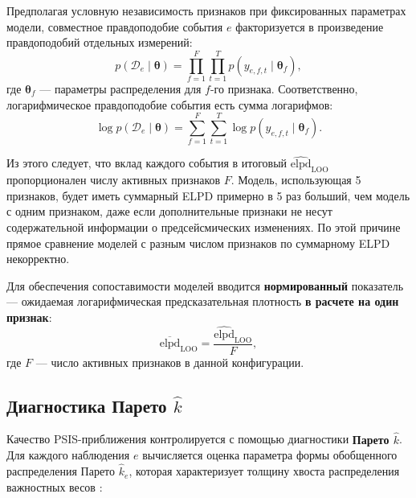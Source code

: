 \documentclass[14pt]{mmcs_article}
\begin{document}
	Предполагая условную независимость признаков при
	фиксированных параметрах модели, совместное правдоподобие
	события $e$ факторизуется в произведение правдоподобий
	отдельных измерений:
	\begin{equation}
		p(\mathcal{D}_e \mid \boldsymbol{\theta}) = 
		\prod_{f=1}^{F} \prod_{t=1}^{T} 
		p(y_{e,f,t} \mid \boldsymbol{\theta}_f),
	\end{equation}
	где $\boldsymbol{\theta}_f$ — параметры распределения для
	$f$-го признака. Соответственно, логарифмическое
	правдоподобие события есть сумма логарифмов:
	\begin{equation}
		\log p(\mathcal{D}_e \mid \boldsymbol{\theta}) = 
		\sum_{f=1}^{F} \sum_{t=1}^{T} 
		\log p(y_{e,f,t} \mid \boldsymbol{\theta}_f).
	\end{equation}
	
	Из этого следует, что вклад каждого события в итоговый
	$\widehat{\mathrm{elpd}}_{\mathrm{LOO}}$ пропорционален числу
	активных признаков $F$. Модель, использующая 5 признаков, будет
	иметь суммарный ELPD примерно в 5 раз больший, чем модель с
	одним признаком, даже если дополнительные признаки не несут
	содержательной информации о предсейсмических изменениях. По этой
	причине прямое сравнение моделей с разным числом признаков по
	суммарному ELPD некорректно.
	
	Для обеспечения сопоставимости моделей вводится
	\textbf{нормированный} показатель — ожидаемая логарифмическая
	предсказательная плотность \textbf{в расчете на один признак}:
	\begin{equation}\label{eq:elpd_per_feature}
		\overline{\mathrm{elpd}}_{\mathrm{LOO}} = 
		\frac{\widehat{\mathrm{elpd}}_{\mathrm{LOO}}}{F},
	\end{equation}
	где $F$ — число активных признаков в данной конфигурации.
	
	
	\subsection*{Диагностика Парето $\hat{k}$}
	
	Качество PSIS-приближения контролируется с помощью
	диагностики \textbf{Парето $\hat{k}$}. Для каждого наблюдения
	$e$ вычисляется оценка параметра формы обобщенного
	распределения Парето $\hat{k}_e$, которая характеризует
	толщину хвоста распределения важностных весов
	\cite{Vehtari2017, Vehtari2024}:
	
\end{document}

